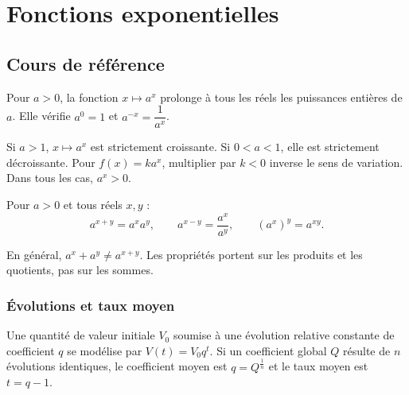 
\chapter{Fonctions exponentielles}
\section{Cours de référence}
Pour $a>0$, la fonction $x\mapsto a^x$ prolonge à tous les réels les puissances entières de $a$. Elle vérifie $a^0=1$ et $a^{-x}=\dfrac{1}{a^x}$.

\begin{center}
\end{center}

\begin{retenir}
Si $a>1$, $x\mapsto a^x$ est strictement croissante. Si $0<a<1$, elle est strictement décroissante. Pour $f(x)=ka^x$, multiplier par $k<0$ inverse le sens de variation. Dans tous les cas, $a^x>0$.
\end{retenir}

Pour $a>0$ et tous réels $x,y$ :
\[
a^{x+y}=a^xa^y,\qquad a^{x-y}=\frac{a^x}{a^y},\qquad (a^x)^y=a^{xy}.
\]

\begin{erreur}
En général, $a^x+a^y\neq a^{x+y}$. Les propriétés portent sur les produits et les quotients, pas sur les sommes.
\end{erreur}

\subsection{Évolutions et taux moyen}
Une quantité de valeur initiale $V_0$ soumise à une évolution relative constante de coefficient $q$ se modélise par $V(t)=V_0q^t$. Si un coefficient global $Q$ résulte de $n$ évolutions identiques, le coefficient moyen est $q=Q^{\frac1n}$ et le taux moyen est $t=q-1$.

